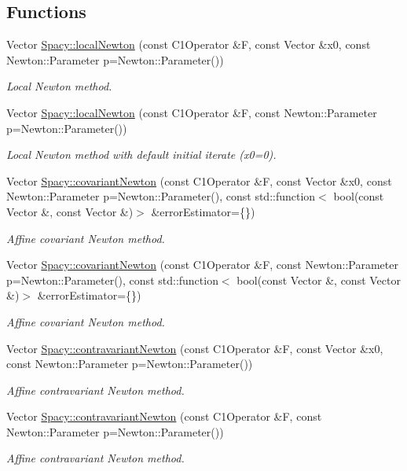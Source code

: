 \subsection*{Functions}
\begin{DoxyCompactItemize}
\item 
Vector \hyperlink{group__NewtonGroup_ga70230bc5f8b83684e04685b584967882}{Spacy\+::local\+Newton} (const C1\+Operator \&F, const Vector \&x0, const Newton\+::\+Parameter p=Newton\+::\+Parameter())
\begin{DoxyCompactList}\small\item\em Local Newton method. \end{DoxyCompactList}\item 
Vector \hyperlink{group__NewtonGroup_gad86d75d93e7d0307c492513c98c48fed}{Spacy\+::local\+Newton} (const C1\+Operator \&F, const Newton\+::\+Parameter p=Newton\+::\+Parameter())
\begin{DoxyCompactList}\small\item\em Local Newton method with default initial iterate (x0=0). \end{DoxyCompactList}\item 
Vector \hyperlink{group__NewtonGroup_gad63424afc4a3a7f48368fd97d6279d56}{Spacy\+::covariant\+Newton} (const C1\+Operator \&F, const Vector \&x0, const Newton\+::\+Parameter p=Newton\+::\+Parameter(), const std\+::function$<$ bool(const Vector \&, const Vector \&)$>$ \&error\+Estimator=\{\})
\begin{DoxyCompactList}\small\item\em Affine covariant Newton method. \end{DoxyCompactList}\item 
Vector \hyperlink{group__NewtonGroup_ga7fd8cb9e0c213a357f5dc1add0ee2eff}{Spacy\+::covariant\+Newton} (const C1\+Operator \&F, const Newton\+::\+Parameter p=Newton\+::\+Parameter(), const std\+::function$<$ bool(const Vector \&, const Vector \&)$>$ \&error\+Estimator=\{\})
\begin{DoxyCompactList}\small\item\em Affine covariant Newton method. \end{DoxyCompactList}\item 
Vector \hyperlink{group__NewtonGroup_ga323071fce88ea5e655bb18fb4233101c}{Spacy\+::contravariant\+Newton} (const C1\+Operator \&F, const Vector \&x0, const Newton\+::\+Parameter p=Newton\+::\+Parameter())
\begin{DoxyCompactList}\small\item\em Affine contravariant Newton method. \end{DoxyCompactList}\item 
Vector \hyperlink{group__NewtonGroup_ga8cde4ccdf9479141f8f8b92607f0f724}{Spacy\+::contravariant\+Newton} (const C1\+Operator \&F, const Newton\+::\+Parameter p=Newton\+::\+Parameter())
\begin{DoxyCompactList}\small\item\em Affine contravariant Newton method. \end{DoxyCompactList}\end{DoxyCompactItemize}


